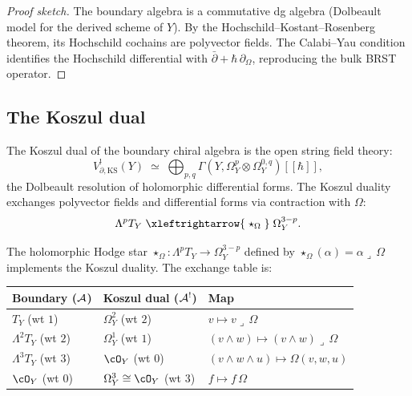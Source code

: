\begin{proof}[Proof sketch]
The boundary algebra is a commutative dg algebra (Dolbeault model for
the derived scheme of $Y$). By the Hochschild--Kostant--Rosenberg
theorem, its Hochschild cochains are polyvector fields. The
Calabi--Yau condition identifies the Hochschild differential with
$\bar\partial + \hbar\,\partial_\Omega$, reproducing the bulk BRST
operator.
\end{proof}


\subsection{The Koszul dual}

\begin{definition}
\label{def:thqg-ks-koszul-dual}
The Koszul dual of the boundary chiral algebra is the open string
field theory:
\begin{equation}%
V_{\partial,\mathrm{KS}}^!(Y)
\;\simeq\;
\bigoplus_{p,q}
\Gamma(Y, \Omega^p_Y \otimes \Omega^{0,q}_Y)[[\hbar]],
\end{equation}
the Dolbeault resolution of holomorphic differential forms. The
Koszul duality exchanges polyvector fields and differential forms
via contraction with $\Omega$:
\begin{equation}%
\Lambda^p T_Y \;\xleftrightarrow{\;\star_\Omega\;}\; \Omega^{3-p}_Y.
\end{equation}
\end{definition}

\begin{proposition}
\label{prop:thqg-ks-koszul-hodge}
The holomorphic Hodge star $\star_\Omega: \Lambda^p T_Y \to
\Omega^{3-p}_Y$ defined by $\star_\Omega(\alpha) = \alpha \lrcorner\, \Omega$
implements the Koszul duality. The exchange table is:
\begin{center}
\renewcommand{\arraystretch}{1.2}
\small
\begin{tabular}{lll}
\textbf{Boundary} ($\mathcal{A}$)
 & \textbf{Koszul dual} ($\mathcal{A}^!$)
 & \textbf{Map} \\
\hline
$T_Y$ (wt $1$) & $\Omega^2_Y$ (wt $2$) & $v \mapsto v \lrcorner\, \Omega$ \\
$\Lambda^2 T_Y$ (wt $2$) & $\Omega^1_Y$ (wt $1$) & $(v \wedge w) \mapsto (v \wedge w) \lrcorner\, \Omega$ \\
$\Lambda^3 T_Y$ (wt $3$) & $\cO_Y$ (wt $0$) & $(v \wedge w \wedge u) \mapsto \Omega(v,w,u)$ \\
$\cO_Y$ (wt $0$) & $\Omega^3_Y \cong \cO_Y$ (wt $3$) & $f \mapsto f\,\Omega$
\end{tabular}
\end{center}
\end{proposition}

